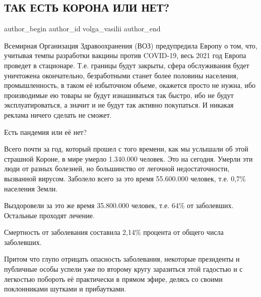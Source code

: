  
 
 
 
 
 
\subsection{ТАК ЕСТЬ КОРОНА ИЛИ НЕТ?}
\label{sec:23_11_2020.fb.volga_vasilii.1.est_korona_ili_net}
\ifcmt
	author_begin
   author_id volga_vasilii
	author_end
\fi
{}

Всемирная Организация Здравоохранения (ВОЗ) предупредила Европу о том, что,
учитывая темпы разработки вакцины против COVID-19, весь 2021 год Европа
проведет в стационаре. Т.е. границы будут закрыты, сфера обслуживания будет
уничтожена окончательно, безработными станет более половины населения,
промышленность, в таком её избыточном объеме, окажется просто не нужна, ибо
производимые ею товары не будут изнашиваться так быстро, ибо не будут
эксплуатироваться, а значит и не будут так активно покупаться. И никакая
реклама ничего сделать не сможет. 

Есть пандемия или её нет? 

Всего почти за год, который прошел с того времени, как мы услышали об этой
страшной Короне, в мире умерло 1.340.000 человек. Это на сегодня.  Умерли эти
люди от разных болезней, но большинство от легочной недостаточности, вызванной
вирусом.  Заболело всего за это время 55.600.000 человек, т.е. 0,7\% населения
Земли. 

Выздоровели за это же время 35.800.000 человек, т.е. 64\% от заболевших. Остальные проходят лечение. 

Смертность от заболевания составила 2,14\% процента от общего числа заболевших. 

Притом что глупо отрицать опасность заболевания, некоторые президенты и
публичные особы успели уже по второму кругу заразиться этой гадостью и с
легкостью побороть её практически в прямом эфире, делясь со своими поклонниками
шутками и прибаутками. 

